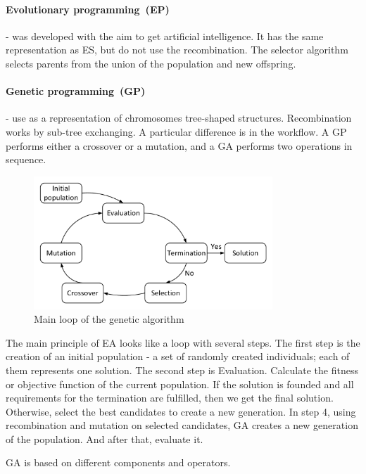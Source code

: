\paragraph{Evolutionary programming~(EP)} - was developed with the aim to get artificial intelligence\cite{eiben03}. It has the same representation as ES, but do not use the recombination. The selector algorithm selects parents from the union of the population and new offspring.
\paragraph{Genetic programming~(GP)} - use as a representation of chromosomes tree-shaped structures. Recombination works by sub-tree exchanging. A particular difference is in the workflow. A GP performs either a crossover or a mutation, and a GA performs two operations in sequence.

\begin{figure}
	\centering
	\includegraphics[width=0.8\textwidth]{images/GeneticLoop.pdf}
	\caption[Main loop of the genetic algorithm]{Main loop of the genetic algorithm}
	\label{fig:GeneticLoop}
\end{figure}

The main principle of EA looks like a loop with several steps.
The first step is the creation of an initial population - a set of randomly created individuals; each of them represents one solution. 
The second step is Evaluation. Calculate the fitness or objective function of the current population.
If the solution is founded and all requirements for the termination are fulfilled, then we get the final solution. Otherwise, select the best candidates to create a new generation.
In step 4, using recombination and mutation on selected candidates, GA creates a new generation of the population. And after that, evaluate it.

GA is based on different components and operators.

